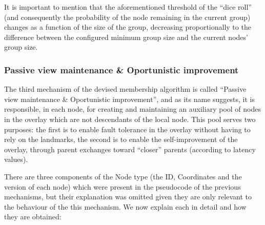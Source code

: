  It is important to mention that the aforementioned threshold of the ``dice roll'' (and consequently the probability of the node remaining in the current group) changes as a function of the size of the group, decreasing proportionally to the difference between the configured minimum group size and the current nodes' group size.

\subsubsection{Passive view maintenance \& Oportunistic improvement} \label{sec:overlay_network:oportunistic_improvement}

The third mechanism of the devised membership algorithm is called ``Passive view maintenance \& Oportunistic improvement'', and as its name suggests, it is responsible, in each node, for creating and maintaining an auxiliary pool of nodes in the overlay which are not descendants of the local node. This pool serves two purposes: the first is to enable fault tolerance in the overlay without having to rely on the landmarks, the second is to enable the self-improvement of the overlay, through parent exchanges toward ``closer'' parents (according to latency values). 

There are three components of the Node type (the ID, Coordinates and the version of each node) which were present in the pseudocode of the previous mechanisms, but their explanation was omitted given they are only relevant to the behaviour of the this mechanism. We now explain each in detail and how they are obtained:

